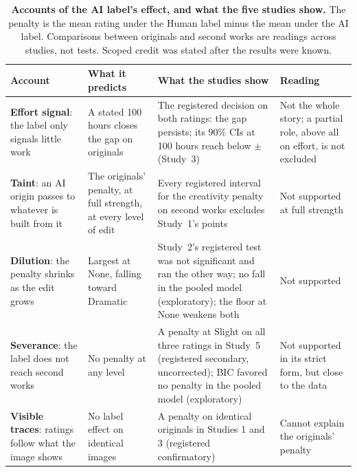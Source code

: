 \begin{table}[tbp]
\centering
\caption{\textbf{Accounts of the AI label's effect, and what the five studies show.} The penalty is the mean rating under the Human label minus the mean under the AI label. Comparisons between originals and second works are readings across studies, not tests. Scoped credit was stated after the results were known.}
\label{tab:accounts}
\small
\setlength{\tabcolsep}{4pt}
\begin{tabular}{@{}p{70pt}p{92pt}p{\dimexpr\textwidth-262pt-6\tabcolsep\relax}p{100pt}@{}}
\toprule
Account & What it predicts & What the studies show & Reading\tabularnewline
\midrule
\raggedright \textbf{Effort signal}: the label only signals little work & \raggedright A stated 100 hours closes the gap on originals & \raggedright The registered decision on both ratings: the gap persists; its 90\% CIs at 100 hours reach below $\pm$\SourceBound{} (Study~3) & \raggedright Not the whole story; a partial role, above all on effort, is not excluded\tabularnewline
\addlinespace[3pt]
\raggedright \textbf{Taint}: an AI origin passes to whatever is built from it & \raggedright The originals' penalty, at full strength, at every level of edit & \raggedright Every registered interval for the creativity penalty on second works excludes Study~1's \SOneHOneCreatDiffPrecise{} points & \raggedright Not supported at full strength\tabularnewline
\addlinespace[3pt]
\raggedright \textbf{Dilution}: the penalty shrinks as the edit grows & \raggedright Largest at None, falling toward Dramatic & \raggedright Study~2's registered test was not significant and ran the other way; no fall in the pooled model (exploratory); the floor at None weakens both & \raggedright Not supported\tabularnewline
\addlinespace[3pt]
\raggedright \textbf{Severance}: the label does not reach second works & \raggedright No penalty at any level & \raggedright A penalty at Slight on all three ratings in Study~5 (registered secondary, uncorrected); BIC favored no penalty in the pooled model (exploratory) & \raggedright Not supported in its strict form, but close to the data\tabularnewline
\addlinespace[3pt]
\raggedright \textbf{Visible traces}: ratings follow what the image shows & \raggedright No label effect on identical images & \raggedright A penalty on identical originals in Studies 1 and 3 (registered confirmatory) & \raggedright Cannot explain the originals' penalty\tabularnewline

\end{tabular}
\end{table}
